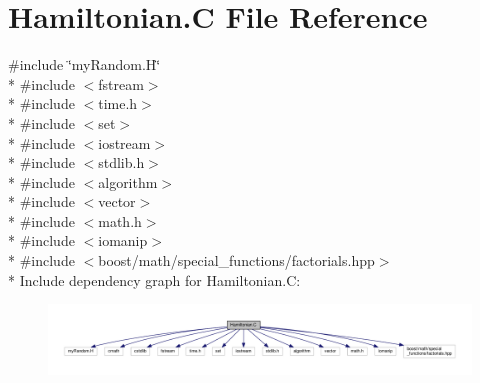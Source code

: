 \hypertarget{_hamiltonian_8_c}{\section{Hamiltonian.\-C File Reference}
\label{_hamiltonian_8_c}
}
{\ttfamily \#include \char`\"{}my\-Random.\-H\char`\"{}}\\*
{\ttfamily \#include $<$fstream$>$}\\*
{\ttfamily \#include $<$time.\-h$>$}\\*
{\ttfamily \#include $<$set$>$}\\*
{\ttfamily \#include $<$iostream$>$}\\*
{\ttfamily \#include $<$stdlib.\-h$>$}\\*
{\ttfamily \#include $<$algorithm$>$}\\*
{\ttfamily \#include $<$vector$>$}\\*
{\ttfamily \#include $<$math.\-h$>$}\\*
{\ttfamily \#include $<$iomanip$>$}\\*
{\ttfamily \#include $<$boost/math/special\-\_\-functions/factorials.\-hpp$>$}\\*
Include dependency graph for Hamiltonian.\-C\-:\nopagebreak
\begin{figure}[H]
\begin{center}
\leavevmode
\includegraphics[width=350pt]{_hamiltonian_8_c__incl}
\end{center}
\end{figure}

